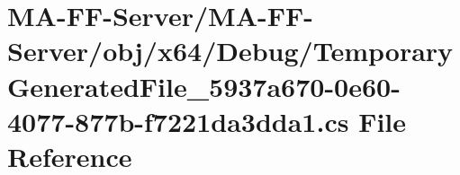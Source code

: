 \hypertarget{x64_2_debug_2_temporary_generated_file__5937a670-0e60-4077-877b-f7221da3dda1_8cs}{}\section{M\+A-\/\+F\+F-\/\+Server/\+M\+A-\/\+F\+F-\/\+Server/obj/x64/\+Debug/\+Temporary\+Generated\+File\+\_\+5937a670-\/0e60-\/4077-\/877b-\/f7221da3dda1.cs File Reference}
\label{x64_2_debug_2_temporary_generated_file__5937a670-0e60-4077-877b-f7221da3dda1_8cs}
